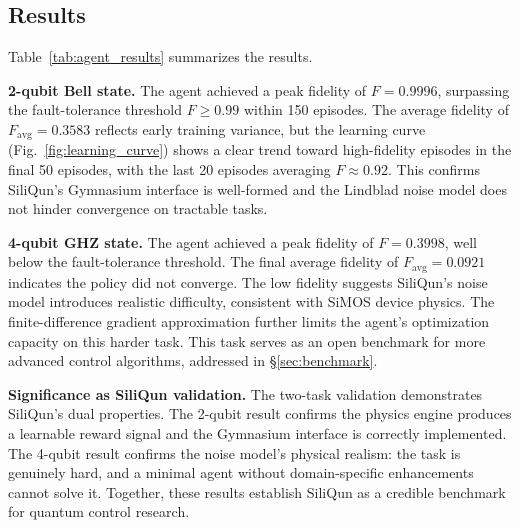 \subsection{Results}
\label{subsec:agent_results}

Table~\ref{tab:agent_results} summarizes the results.

\begin{table}[h]
\centering
\caption{PPO agent performance on SiliQun. Best fidelity and final average fidelity over 150 training episodes. The 2-qubit Bell state task is solved ($F \geq 0.99$), confirming the platform interface is well-formed; the 4-qubit GHZ task is not, confirming the noise model's physical realism.}
\label{tab:agent_results}
\end{table}

\textbf{2-qubit Bell state.} The agent achieved a peak fidelity of $F = 0.9996$, surpassing the fault-tolerance threshold $F \geq 0.99$ within 150 episodes. The average fidelity of $F_\text{avg} = 0.3583$ reflects early training variance, but the learning curve (Fig.~\ref{fig:learning_curve}) shows a clear trend toward high-fidelity episodes in the final 50 episodes, with the last 20 episodes averaging $F \approx 0.92$. This confirms SiliQun's Gymnasium interface is well-formed and the Lindblad noise model does not hinder convergence on tractable tasks.

\textbf{4-qubit GHZ state.} The agent achieved a peak fidelity of $F = 0.3998$, well below the fault-tolerance threshold. The final average fidelity of $F_\text{avg} = 0.0921$ indicates the policy did not converge. The low fidelity suggests SiliQun's noise model introduces realistic difficulty, consistent with SiMOS device physics. The finite-difference gradient approximation further limits the agent's optimization capacity on this harder task. This task serves as an open benchmark for more advanced control algorithms, addressed in \S\ref{sec:benchmark}.

\textbf{Significance as SiliQun validation.} The two-task validation demonstrates SiliQun's dual properties. The 2-qubit result confirms the physics engine produces a learnable reward signal and the Gymnasium interface is correctly implemented. The 4-qubit result confirms the noise model's physical realism: the task is genuinely hard, and a minimal agent without domain-specific enhancements cannot solve it. Together, these results establish SiliQun as a credible benchmark for quantum control research.

